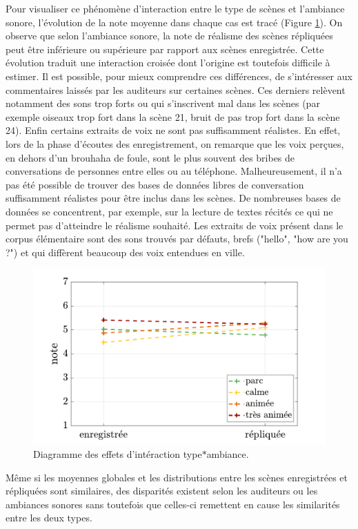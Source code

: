 Pour visualiser ce phénomène d'interaction entre le type de scènes et l'ambiance sonore, l'évolution de la note moyenne dans chaque cas est tracé (Figure \ref{fig:interaction_ambianceType}). On observe que selon l'ambiance sonore, la note de réalisme des scènes répliquées peut être inférieure ou supérieure par rapport aux scènes enregistrée. Cette évolution traduit une interaction croisée dont l'origine est toutefois difficile à estimer. Il est possible, pour mieux comprendre ces différences, de s'intéresser aux commentaires laissés par les auditeurs sur certaines scènes. Ces derniers relèvent notamment des sons trop forts ou qui s'inscrivent mal dans les scènes (par exemple oiseaux trop fort dans la scène 21, bruit de pas trop fort dans la scène 24). Enfin certains extraits de voix ne sont pas suffisamment réalistes. En effet, lors de la phase d'écoutes des enregistrement, on remarque que les voix perçues, en dehors d'un brouhaha de foule, sont le plus souvent des bribes de conversations de personnes entre elles ou au téléphone. Malheureusement, il n'a pas été possible de trouver des bases de données libres de conversation suffisamment réalistes pour être inclus dans les scènes. De nombreuses bases de données se concentrent, par exemple, sur la lecture de textes récités \cite{el2011survey, kominek2004cmu, barker2015third} ce qui ne permet pas d'atteindre le réalisme souhaité. Les extraits de voix présent dans le corpus élémentaire sont des sons trouvés par défauts, brefs ("hello", "how are you ?") et qui diffèrent beaucoup des voix entendues en ville.

\begin{figure}[h]
\centering
\includegraphics[width=0.8\linewidth]{./figures/test_perceptif/testPerceptif_interactionAmbiance.pdf}
\caption{Diagramme des effets d'intéraction type$*$ambiance.}\label{fig:interaction_ambianceType}
\end{figure}


Même si les moyennes globales et les distributions entre les scènes enregistrées et répliquées sont similaires, des disparités existent selon les auditeurs ou les ambiances sonores sans toutefois que celles-ci remettent en cause les similarités entre les deux types.\\
